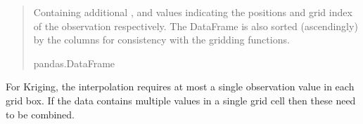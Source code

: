 \documentclass[letterpaper,10pt,english]{sphinxmanual}
\begin{document}
\begin{fulllineitems}
\begin{quote}
\begin{description}
\begin{itemize}
\end{itemize}

\sphinxAtStartPar
{} \textendash{} Containing additional , and  values
indicating the positions and grid index of the observation
respectively. The DataFrame is also sorted (ascendingly) by the
 columns for consistency with the gridding functions.

\sphinxAtStartPar
pandas.DataFrame

\end{description}\end{quote}

\end{fulllineitems}


\sphinxAtStartPar
For Kriging, the interpolation requires at most a single observation value in each grid box. If the
data contains multiple values in a single grid cell then these need to be combined.
\end{document}
